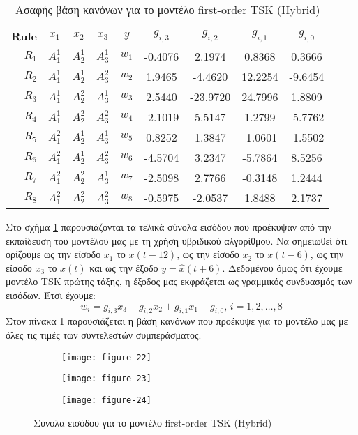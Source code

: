 \documentclass[11pt,a4paper,titlepage, oneside]{article}
\newlength\figureheight
\newlength\figurewidth
\begin{document}
			\begin{table}
				\centering
				\begin{tabular}[b]{r c c c||c|c|c|c|c}
					 \bfseries{Rule} & $x_1$ & $x_2$ & $x_3$ & $y$ & $g_{i, 3}$ & $g_{i, 2}$ & $g_{i, 1}$ & $g_{i, 0}$\\ \hhline{====||=|====}
						$R_{1}$ & $A_1^1$ & $A_2^1$ & $A_3^1$ & $w_1$ & -0.4076 & 2.1974 & 0.8368 & 0.3666 \\%
						$R_{2}$ & $A_1^1$ & $A_2^1$ & $A_3^2$ & $w_2$ & 1.9465 & -4.4620 & 12.2254 & -9.6454 \\%
						$R_{3}$ & $A_1^1$ & $A_2^2$ & $A_3^1$ & $w_3$ & 2.5440 & -23.9720 & 24.7996 & 1.8809 \\%
						$R_{4}$ & $A_1^1$ & $A_2^2$ & $A_3^2$ & $w_4$ & -2.1019 & 5.5147 & 1.2799 & -5.7762 \\%
						$R_{5}$ & $A_1^2$ & $A_2^1$ & $A_3^1$ & $w_5$ & 0.8252 & 1.3847 & -1.0601 & -1.5502 \\%
						$R_{6}$ & $A_1^2$ & $A_2^1$ & $A_3^2$ & $w_6$ & -4.5704 & 3.2347 & -5.7864 & 8.5256 \\%
						$R_{7}$ & $A_1^2$ & $A_2^2$ & $A_3^1$ & $w_7$ & -2.5098 & 2.7766 & -0.3148 & 1.2444 \\%
						$R_{8}$ & $A_1^2$ & $A_2^2$ & $A_3^2$ & $w_8$ & -0.5975 & -2.0537 & 1.8488 & 2.1737 \\%
				\end{tabular}
				\caption{Ασαφής βάση κανόνων για το μοντέλο first-order TSK (Hybrid)}
				\label{tab:tsk_hybrid_rulebase}
			\end{table}
			Στο σχήμα \ref{fig:tsk_hybrid_input_sets} παρουσιάζονται τα τελικά σύνολα εισόδου που προέκυψαν από την εκπαίδευση του μοντέλου μας με τη χρήση υβριδικού αλγορίθμου. Να σημειωθεί ότι ορίζουμε ως την είσοδο $x_1$ το $x(t-12)$, ως την είσοδο $x_2$ το $x(t-6)$, ως την είσοδο $x_3$ το $x(t)$ και ως την έξοδο $y = \hat{x}(t+6)$. Δεδομένου όμως ότι έχουμε μοντέλο TSK πρώτης τάξης, η έξοδος μας εκφράζεται ως γραμμικός συνδυασμός των εισόδων. Έτσι έχουμε:
			$$ w_i = g_{i,3}x_3 + g_{i,2}x_2 + g_{i, 1}x_1 + g_{i,0},\, i = 1,2,\ldots,8 $$
			Στον πίνακα \ref{tab:tsk_hybrid_rulebase} παρουσιάζεται η βάση κανόνων που προέκυψε για το μοντέλο μας με όλες τις τιμές των συντελεστών συμπεράσματος.
			
			\begin{figure}[]
			 	\setlength{}
				\setlength{}	
				\centering
				\begin{subfigure}[b]{0.32\textwidth}
					\texttt{[image: figure-22]}
				\end{subfigure}
				\begin{subfigure}[b]{0.32\textwidth}
					\texttt{[image: figure-23]}
				\end{subfigure}
				\begin{subfigure}[b]{0.32\textwidth}
					\texttt{[image: figure-24]}
				\end{subfigure}
				\caption{Σύνολα εισόδου για το μοντέλο first-order TSK (Hybrid)}
				\label{fig:tsk_hybrid_input_sets}
			\end{figure}
	\newpage
\end{document}
